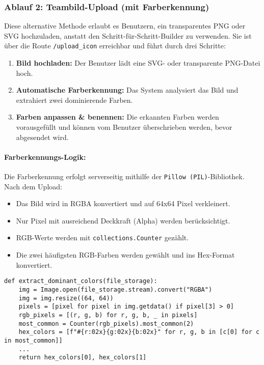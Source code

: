 \documentclass[12pt]{article}
\begin{document}
\subsubsection*{Ablauf 2: Teambild-Upload (mit Farberkennung)}

Diese alternative Methode erlaubt es Benutzern, ein transparentes PNG oder SVG hochzuladen, anstatt den Schritt-für-Schritt-Builder zu verwenden. Sie ist über die Route \texttt{/upload\_icon} erreichbar und führt durch drei Schritte:

\begin{enumerate}
    \item \textbf{Bild hochladen:} Der Benutzer lädt eine SVG- oder transparente PNG-Datei hoch.
    \item \textbf{Automatische Farberkennung:} Das System analysiert das Bild und extrahiert zwei dominierende Farben.
    \item \textbf{Farben anpassen & benennen:} Die erkannten Farben werden vorausgefüllt und können vom Benutzer überschrieben werden, bevor abgesendet wird.
\end{enumerate}

\paragraph{Farberkennungs-Logik:}
Die Farberkennung erfolgt serverseitig mithilfe der \texttt{Pillow (PIL)}-Bibliothek. Nach dem Upload:

\begin{itemize}
    \item Das Bild wird in RGBA konvertiert und auf 64x64 Pixel verkleinert.
    \item Nur Pixel mit ausreichend Deckkraft (Alpha) werden berücksichtigt.
    \item RGB-Werte werden mit \texttt{collections.Counter} gezählt.
    \item Die zwei häufigsten RGB-Farben werden gewählt und ins Hex-Format konvertiert.
\end{itemize}

\begin{verbatim}
def extract_dominant_colors(file_storage):
    img = Image.open(file_storage.stream).convert("RGBA")
    img = img.resize((64, 64))
    pixels = [pixel for pixel in img.getdata() if pixel[3] > 0]
    rgb_pixels = [(r, g, b) for r, g, b, _ in pixels]
    most_common = Counter(rgb_pixels).most_common(2)
    hex_colors = [f"#{r:02x}{g:02x}{b:02x}" for r, g, b in [c[0] for c in most_common]]
    ...
    return hex_colors[0], hex_colors[1]
\end{verbatim}
\end{document}
